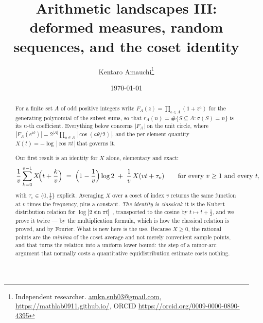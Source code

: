 \documentclass[11pt,a4paper]{article}
\title{Arithmetic landscapes III:\\
deformed measures, random sequences, and the coset identity}
\author{Kentaro Amauchi\thanks{Independent researcher.
\href{mailto:amkn.sub03@gmail.com}{amkn.sub03@gmail.com},
\url{https://mathlab0911.github.io/}, ORCID \url{https://orcid.org/0009-0000-0890-4395}}}
\date{\today}
\theoremstyle{plain}
\theoremstyle{definition}
\theoremstyle{remark}
\begin{document}
\maketitle

\begin{abstract}
For a finite set $A$ of odd positive integers write
$F_A(z)=\prod_{a\in A}(1+z^{a})$ for the generating polynomial of the subset
sums, so that $r_A(n)=\#\{S\subseteq A:\sigma(S)=n\}$ is its $n$-th coefficient.
Everything below concerns $|F_A|$ on the unit circle, where
$|F_A(e^{i\theta})|=2^{|A|}\prod_{a\in A}|\cos(a\theta/2)|$, and the per-element
quantity $X(t)=-\log|\cos\pi t|$ that governs it.

Our first result is an identity for $X$ alone, elementary and exact:
\[
  \frac1v\sum_{k=0}^{v-1}X\!\Bigl(t+\frac kv\Bigr)
  \;=\;\Bigl(1-\frac1v\Bigr)\log2\;+\;\frac1v\,X(vt+\tau_v)
  \qquad\text{for every }v\ge1\text{ and every }t,
\]
with $\tau_v\in\{0,\tfrac12\}$ explicit. Averaging $X$ over a coset of index $v$
returns the same function at $v$ times the frequency, plus a constant.
\emph{The identity is classical}: it is the Kubert distribution relation for
$\log|2\sin\pi t|$~\cite{KL}, transported to the cosine by $t\mapsto t+\tfrac12$,
and we prove it twice --- by the multiplication formula, which is how the
classical relation is proved, and by Fourier. What is new here is the use.
Because $X\ge0$, the rational points are the \emph{minima} of the coset average
and not merely convenient sample points, and that turns the relation into a
uniform lower bound: the step of a minor-arc argument that normally costs a
quantitative equidistribution estimate costs nothing.


\end{abstract}
\end{document}
